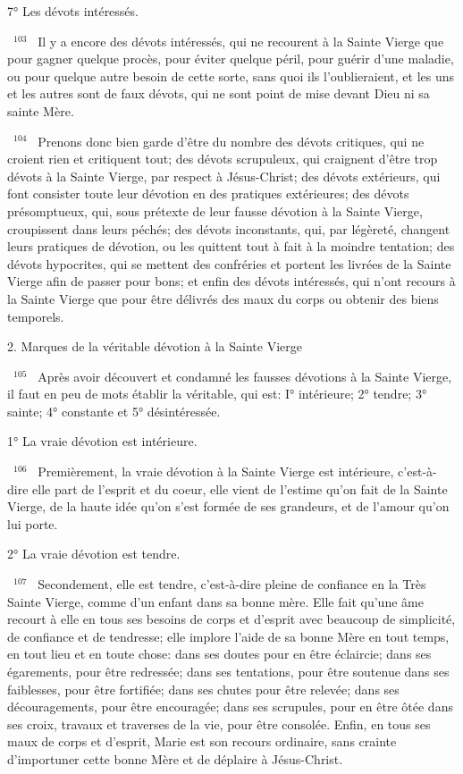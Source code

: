 \documentclass[paper=a5,pagesize=pdftex,fontsize=15pt,headinclude=on,twoside=off]{scrbook}
\newcommand{\negphantom}[1]{\settowidth{\dimen0}{#1}\hspace*{-\dimen0}}
\newcommand{\versenb}[1]{\par \vspace{10pt}~\negphantom{~${}^{#1}$~}${}^{#1}$~}
\begin{document}
7° Les dévots intéressés.
\versenb{103} Il y a encore des dévots intéressés, qui ne recourent à la Sainte Vierge que pour gagner quelque procès,
pour éviter quelque péril, pour guérir d'une maladie, ou pour quelque autre besoin de cette sorte, sans quoi ils
l'oublieraient, et les uns et les autres sont de faux dévots, qui ne sont point de mise devant Dieu ni sa sainte Mère.
\versenb{104} Prenons donc bien garde d'être du nombre des dévots critiques, qui ne croient rien et critiquent tout; des
dévots scrupuleux, qui craignent d'être trop dévots à la Sainte Vierge, par respect à Jésus-Christ; des dévots
extérieurs, qui font consister toute leur dévotion en des pratiques extérieures; des dévots présomptueux, qui, sous
prétexte de leur fausse dévotion à la Sainte Vierge, croupissent dans leurs péchés; des dévots inconstants, qui,
par légèreté, changent leurs pratiques de dévotion, ou les quittent tout à fait à la moindre tentation; des dévots
hypocrites, qui se mettent des confréries et portent les livrées de la Sainte Vierge afin de passer pour bons; et
enfin des dévots intéressés, qui n'ont recours à la Sainte Vierge que pour être délivrés des maux du corps ou
obtenir des biens temporels.

2. Marques de la véritable dévotion à la Sainte Vierge
\versenb{105} Après avoir découvert et condamné les fausses dévotions à la Sainte Vierge, il faut en peu de mots établir la
véritable, qui est: I° intérieure; 2° tendre; 3° sainte; 4° constante et 5° désintéressée.

1° La vraie dévotion est intérieure.
\versenb{106} Premièrement, la vraie dévotion à la Sainte Vierge est intérieure, c'est-à-dire elle part de l'esprit et du coeur,
elle vient de l'estime qu'on fait de la Sainte Vierge, de la haute idée qu'on s'est formée de ses grandeurs, et de
l'amour qu'on lui porte.

2° La vraie dévotion est tendre.
\versenb{107} Secondement, elle est tendre, c'est-à-dire pleine de confiance en la Très Sainte Vierge, comme d'un enfant
dans sa bonne mère. Elle fait qu'une âme recourt à elle en tous ses besoins de corps et d'esprit avec beaucoup de
simplicité, de confiance et de tendresse; elle implore l'aide de sa bonne Mère en tout temps, en tout lieu et en toute
chose: dans ses doutes pour en être éclaircie; dans ses égarements, pour être redressée; dans ses tentations,
pour être soutenue dans ses faiblesses, pour être fortifiée; dans ses chutes pour être relevée; dans ses
découragements, pour être encouragée; dans ses scrupules, pour en être ôtée dans ses croix, travaux et traverses
de la vie, pour être consolée. Enfin, en tous ses maux de corps et d'esprit, Marie est son recours ordinaire, sans
crainte d'importuner cette bonne Mère et de déplaire à Jésus-Christ.
\end{document}
